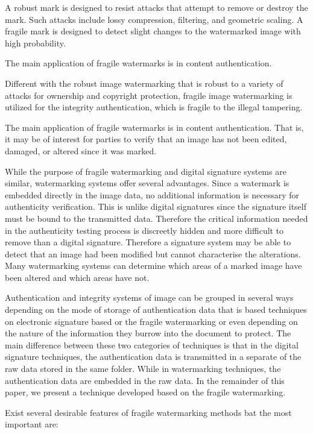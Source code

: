 \documentclass[runningheads]{llncs}
\begin{document}
A robust mark is designed to resist attacks that attempt to remove or destroy the mark. Such attacks include lossy compression, filtering, and geometric scaling. A fragile mark is designed to detect slight changes to the watermarked image with high probability.

The main application of fragile watermarks is in content authentication.

Different with the robust image watermarking that is robust to a variety of attacks for ownership and copyright protection, fragile image watermarking is utilized for the integrity authentication, which is fragile to the illegal tampering.

The main application of fragile watermarks is in content authentication. That is, it may be of interest for parties to verify that an image has not been edited, damaged, or altered since it was marked.

While the purpose of fragile watermarking and digital signature systems are similar, watermarking systems offer several advantages. Since a watermark is embedded directly in the image data, no additional information is necessary for authenticity verification. This is unlike digital signatures since the signature itself must be bound to the transmitted data. Therefore the critical information needed in the authenticity testing process is discreetly hidden and more difficult to remove than a digital signature. Therefore a signature system may be able to detect that an image had been modified but cannot characterise the alterations. Many watermarking systems can determine which areas of a marked image have been altered and which areas have not.

Authentication and integrity systems of image can be grouped in several ways depending on the mode of storage of authentication data that is based techniques on electronic signature based or the fragile watermarking or even depending on the nature of the information they burrow into the document to protect. The main difference between these two categories of techniques is that in the digital signature techniques, the authentication data is transmitted in a separate of the raw data stored in the same folder. While in watermarking techniques, the authentication data are embedded in the raw data. In the remainder of this paper, we present a technique developed based on the fragile watermarking. \cite{boujemaa2016fragile}

Exist several desirable features of fragile watermarking methods bat the most important are:
\end{document}
